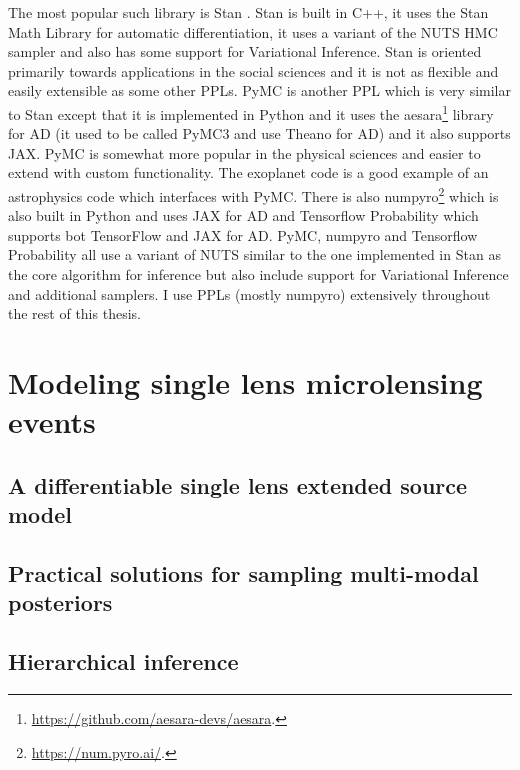 \documentclass[12pt,dvipsnames]{report}
\begin{document}
The most popular such library is \textsf{Stan} \citep{2017JSS....76....1C}. 
Stan is built in \textsf{C++}, it uses the \textsf{Stan Math Library} for automatic 
differentiation, it uses a variant of the NUTS HMC sampler and also has some 
support for Variational Inference. \textsf{Stan} is oriented primarily towards 
applications in the social sciences and it is not as flexible and easily extensible 
as some other PPLs. \textsf{PyMC} is another PPL which is very similar to 
\textsf{Stan} except that it is implemented in \textsf{Python} and it uses 
the \textsf{aesara}\footnote{\url{https://github.com/aesara-devs/aesara}.} library 
for AD (it used to be called \textsf{PyMC3} and use \textsf{Theano} for AD) and it 
also supports \textsf{JAX}. 
\textsf{PyMC} is somewhat more popular in the physical sciences and easier to 
extend  with custom functionality. The \textsf{exoplanet} code 
\citep{2021JOSS....6.3285F} is a good example of an astrophysics code which 
interfaces with \textsf{PyMC}.  There is also 
\textsf{numpyro}\footnote{\url{https://num.pyro.ai/}.}
\citep{arXiv:1912.11554} which is also built in \textsf{Python} and uses 
\textsf{JAX} for AD and \textsf{Tensorflow Probability} \citep{arXiv:1711.10604} 
which supports bot \textsf{TensorFlow} and \textsf{JAX} for AD. \textsf{PyMC}, \textsf{numpyro}
and \textsf{Tensorflow Probability} all use a variant of NUTS similar to the one 
implemented in \textsf{Stan} as the core algorithm for inference but also 
include support for Variational Inference and additional samplers. 
I use PPLs (mostly \textsf{numpyro}) extensively throughout the rest of this thesis.

\chapter{Modeling single lens microlensing events}
\label{ch:microlensing}
\section{A differentiable single lens extended source model}
\section{Practical solutions for sampling multi-modal posteriors}
\section{Hierarchical inference}
\end{document}
